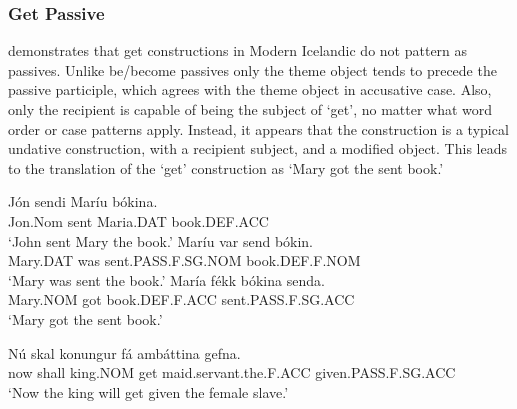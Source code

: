 \subsubsection{Get Passive}
\cite{Sigursson.2012b} demonstrates that get constructions in Modern Icelandic do not pattern as passives. Unlike be/become passives only the theme object tends to precede the passive participle, which agrees with the theme object in accusative case. Also, only the recipient is capable of being the subject of `get', no matter what word order or case patterns apply. Instead, it appears that the construction is a typical undative construction, with a recipient subject, and a modified object. This leads to the translation of the `get' construction as `Mary got the sent book.' 
\begin{exe}
\ex
\begin{xlist}
\ex \gll Jón sendi Maríu bókina.\\
Jon.Nom sent Maria.DAT book.DEF.ACC\\
\trans `John sent Mary the book.'
\ex \gll Maríu var send bókin.\\
Mary.DAT was sent.PASS.F.SG.NOM book.DEF.F.NOM\\
\trans `Mary was sent the book.'
\ex \gll María fékk bókina senda.\\
Mary.NOM got book.DEF.F.ACC sent.PASS.F.SG.ACC\\
\trans `Mary got the sent book.'
\end{xlist}
\ex
\begin{xlist}
\ex \gll Nú skal konungur fá ambáttina gefna.\\
now shall king.NOM get maid.servant.the.F.ACC given.PASS.F.SG.ACC\\
‘Now the king will get given the female slave.’
\end{xlist}
\end{exe}
